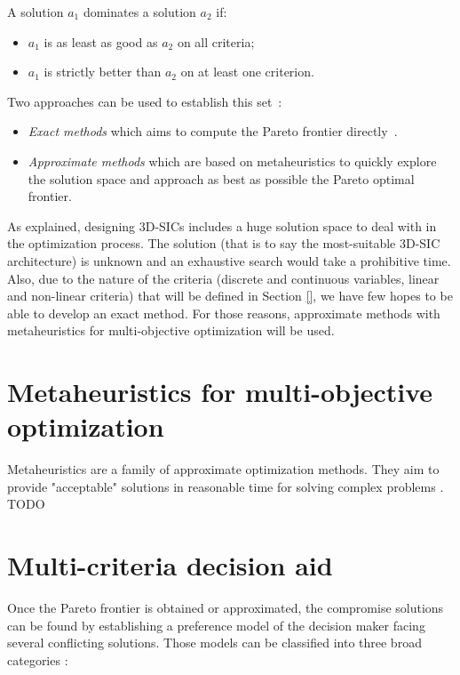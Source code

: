 \begin{definition}[Dominance]
A solution $a_1$ dominates a solution $a_2$ if:
\begin{itemize}
\item $a_1$ is as least as good as $a_2$ on all criteria;
\item $a_1$ is strictly better than $a_2$ on at least one criterion.
\end{itemize}
\end{definition}

Two approaches can be used to establish this set~\cite{Vin92}:
\begin{itemize}
\item \textit{Exact methods} which aims to compute the Pareto frontier directly~\cite{EhrgottGandibleuxbook02,steuer86a}.
\item \textit{Approximate methods} which are based on metaheuristics to quickly explore the solution space and approach as best as possible the Pareto optimal frontier\cite{talbi09}.
\end{itemize}
As explained, designing 3D-SICs includes a huge solution space to deal with in the optimization process. The solution (that is to say the most-suitable 3D-SIC architecture) is unknown and an exhaustive search would take a prohibitive time. Also, due to the nature of the criteria (discrete and continuous variables, linear and non-linear criteria) that will be defined in Section \ref{}, we have few hopes to be able to develop an exact method. For those reasons, approximate methods with metaheuristics for multi-objective optimization will be used.

\section{Metaheuristics for multi-objective optimization}
\label{subsec:metaheuristics}
Metaheuristics are a family of approximate optimization methods. They aim to provide "acceptable" solutions in reasonable time for solving complex problems \cite{talbi09}.\\
TODO

\section{Multi-criteria decision aid}
\label{subsec:mcda}
Once the Pareto frontier is obtained or approximated, the compromise solutions can be found by establishing a preference model of the decision maker facing several conflicting solutions. Those models can be classified into three broad categories \cite{Vin92, beltstew}:


